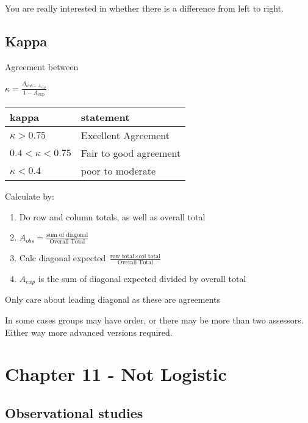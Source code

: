 \documentclass[
  letterpaper,
  DIV=11,
  numbers=noendperiod]{scrreprt}
\providecommand{\tightlist}{%
  \setlength{\itemsep}{0pt}\setlength{\parskip}{0pt}}\usepackage{longtable,booktabs,array}
\begin{document}
You are really interested in whether there is a difference from left to
right.

\hypertarget{kappa}{%
\subsection{Kappa}\label{kappa}}

Agreement between

\(\kappa =\frac{A_{\text{obs} - A_{\text{exp}}}}{1 - A_{\text{exp}}}\)

\begin{longtable}[]{@{}ll@{}}
\toprule()
kappa & statement \\
\midrule()
\endhead
\(\kappa >0.75\) & Excellent Agreement \\
\(0.4<\kappa <0.75\) & Fair to good agreement \\
\(\kappa <0.4\) & poor to moderate \\
\bottomrule()
\end{longtable}

Calculate by:

\begin{enumerate}
\def\labelenumi{\arabic{enumi})}
\tightlist
\item
  Do row and column totals, as well as overall total
\item
  \(A_{obs} = \frac{\text{sum of diagonal}}{\text{Overall Total}}\)
\item
  Calc diagonal expected
  \(\frac{\text{row total}\times \text{col total}}{\text{Overall Total}}\)
\item
  \(A_{exp}\) is the sum of diagonal expected divided by overall total
\end{enumerate}

Only care about leading diagonal as these are agreements

In some cases groups may have order, or there may be more than two
assessors. Either way more advanced versions required.

\hypertarget{chapter-11---not-logistic}{%
\section{Chapter 11 - Not Logistic}\label{chapter-11---not-logistic}}

\hypertarget{observational-studies}{%
\subsection{Observational studies}\label{observational-studies}}
\end{document}
